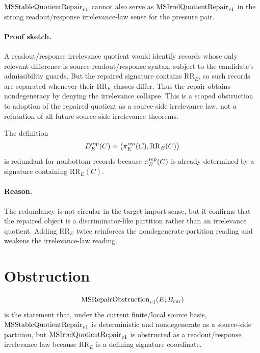 \begin{proposition}
\(\mathrm{MSStableQuotientRepair}_{v1}\) cannot also serve as \(\mathrm{MSIrrelQuotientRepair}_{v1}\) in the strong
readout/response irrelevance-law sense for the pressure pair.
\end{proposition}

\paragraph{Proof sketch.}
A readout/response irrelevance quotient would identify records whose only
relevant difference is source readout/response syntax, subject to the
candidate's admissibility guards. But the repaired signature contains
\(\mathrm{RR}_E\), so such records are separated whenever their
\(\mathrm{RR}_E\) classes differ. Thus the repair obtains nondegeneracy by
denying the irrelevance collapse. This is a scoped obstruction to adoption of
the repaired quotient as a source-side irrelevance law, not a refutation of
all future source-side irrelevance theorems.

\begin{proposition}
The definition
\[
  D^{\mathrm{rep}}_E(C)=\bigl(\pi^{\mathrm{rep}}_E(C),\mathrm{RR}_E(C)\bigr)
\]
is redundant for nonbottom records because \(\pi^{\mathrm{rep}}_E(C)\) is already
determined by a signature containing \(\mathrm{RR}_E(C)\).
\end{proposition}

\paragraph{Reason.}
The redundancy is not circular in the target-import sense, but it confirms
that the repaired object is a discriminator-like partition rather than an
irrelevance quotient. Adding \(\mathrm{RR}_E\) twice reinforces the
nondegenerate partition reading and weakens the irrelevance-law reading.

\section{Obstruction}

\begin{definition}
\[
  \mathrm{MSRepairObstruction}_{v1}(E;B_{\mathrm{cur}})
\]
is the statement that, under the current finite/local source basis,
\(\mathrm{MSStableQuotientRepair}_{v1}\) is deterministic and nondegenerate as a source-side
partition, but \(\mathrm{MSIrrelQuotientRepair}_{v1}\) is obstructed as a readout/response
irrelevance law because \(\mathrm{RR}_E\) is a defining signature coordinate.
\end{definition}

